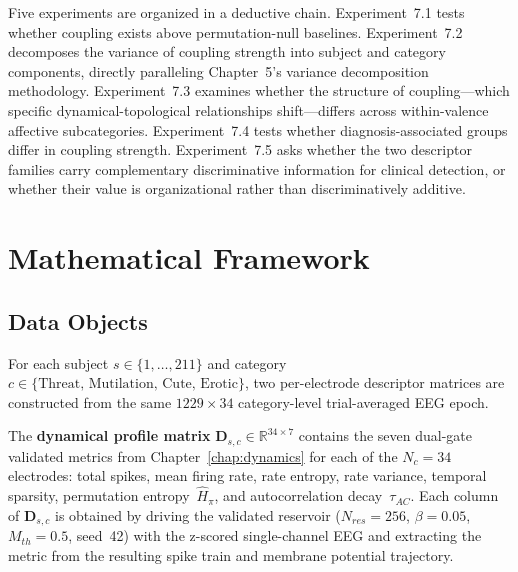 Five experiments are organized in a deductive chain. Experiment~7.1 tests whether coupling exists above permutation-null baselines. Experiment~7.2 decomposes the variance of coupling strength into subject and category components, directly paralleling Chapter~5's variance decomposition methodology. Experiment~7.3 examines whether the structure of coupling---which specific dynamical-topological relationships shift---differs across within-valence affective subcategories. Experiment~7.4 tests whether diagnosis-associated groups differ in coupling strength. Experiment~7.5 asks whether the two descriptor families carry complementary discriminative information for clinical detection, or whether their value is organizational rather than discriminatively additive.


\section{Mathematical Framework}
\label{sec:ch7_framework}

\subsection{Data Objects}

For each subject $s \in \{1,\ldots,211\}$ and category $c \in \{\text{Threat, Mutilation, Cute, Erotic}\}$, two per-electrode descriptor matrices are constructed from the same $1229 \times 34$ category-level trial-averaged EEG epoch.

The \textbf{dynamical profile matrix} $\mathbf{D}_{s,c} \in \mathbb{R}^{34 \times 7}$ contains the seven dual-gate validated metrics from Chapter~\ref{chap:dynamics} for each of the $N_c = 34$ electrodes: total spikes, mean firing rate, rate entropy, rate variance, temporal sparsity, permutation entropy~$\hat{H}_\pi$, and autocorrelation decay~$\tau_{AC}$. Each column of $\mathbf{D}_{s,c}$ is obtained by driving the validated reservoir ($N_{res}=256$, $\beta=0.05$, $M_{th}=0.5$, seed~42) with the z-scored single-channel EEG and extracting the metric from the resulting spike train and membrane potential trajectory.

